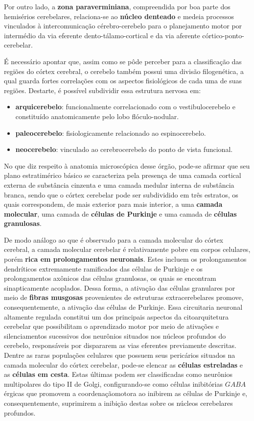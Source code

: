 \documentclass[
]{book}
\providecommand{\tightlist}{%
  \setlength{\itemsep}{0pt}\setlength{\parskip}{0pt}}
\theoremstyle{definition}
\theoremstyle{definition}
\theoremstyle{definition}
\theoremstyle{definition}
\theoremstyle{remark}
\begin{document}
Por outro lado, a \textbf{zona paraverminiana}, compreendida por boa parte dos hemisérios cerebelares, relaciona-se ao \textbf{núcleo denteado} e medeia processos vinculados à intercomunicação cérebro-cerebelo para o planejamento motor por intermédio da via eferente dento-tálamo-cortical e da via aferente córtico-ponto-cerebelar.

É necessário apontar que, assim como se pôde perceber para a classificação das regiões do córtex cerebral, o cerebelo também possui uma divisão filogenética, a qual guarda fortes correlações com os aspectos fisiológicos de cada uma de suas regiões. Destarte, é possível subdividir essa estrutura nervosa em:

\begin{itemize}
\tightlist
\item
  \textbf{arquicerebelo}: funcionalmente correlacionado com o vestibulocerebelo e constituído anatomicamente pelo lobo flóculo-nodular.
\item
  \textbf{paleocerebelo}: fisiologicamente relacionado ao espinocerebelo.
\item
  \textbf{neocerebelo}: vinculado ao cerebrocerebelo do ponto de vista funcional.
\end{itemize}

No que diz respeito à anatomia microscópica desse órgão, pode-se afirmar que seu plano estratimérico básico se caracteriza pela presença de uma camada cortical externa de substância cinzenta e uma camada medular interna de substância branca, sendo que o córtex cerebelar pode ser subdividido em três estratos, os quais correspondem, de mais exterior para mais interior, a uma \textbf{camada molecular}, uma camada de \textbf{células de Purkinje} e uma camada de \textbf{células granulosas}.

De modo análogo ao que é observado para a camada molecular do córtex cerebral, a camada molecular cerebelar é relativamente pobre em corpos celulares, porém \textbf{rica em prolongamentos neuronais}. Estes incluem os prolongamentos dendríticos extremamente ramificados das células de Purkinje e os prolongamentos axônicos das células granulosas, os quais se encontram sinapticamente acoplados. Dessa forma, a ativação das células granulares por meio de \textbf{fibras musgosas} provenientes de estruturas extracerebelares promove, consequentemente, a ativação das células de Purkinje. Essa circuitaria neuronal altamente regulada constitui um dos principais aspectos da citoarquitetura cerebelar que possibilitam o aprendizado motor por meio de ativações e silenciamentos sucessivos dos neurônios situados nos núcleos profundos do cerebelo, responsáveis por dispararem as vias eferentes previamente descritas. Dentre as raras populações celulares que possuem seus pericários situados na camada molecular do córtex cerebelar, pode-se elencar as \textbf{células estreladas} e as \textbf{células em cesta}. Estas últimas podem ser classificadas como neurônios multipolares do tipo II de Golgi, configurando-se como células inibitórias \(GABA\)érgicas que promovem a coordenaçãomotora ao inibirem as células de Purkinje e, consequentemente, suprimirem a inibição destas sobre os núcleos cerebelares profundos.
\end{document}
